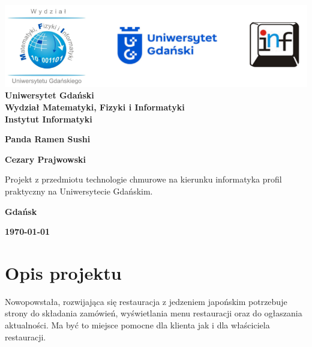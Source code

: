 \documentclass[12pt,a4paper]{article}
\newcommand{\hmwkTitle}{Panda Ramen Sushi} %
\newcommand{\hmwkDueDate}{\today} %
\newcommand{\hmwkAuthorName}{Cezary Prajwowski} %
\begin{document}
\begin{titlepage}
    \vfill
	\begin{center}
	\hspace*{-1cm}
	\vspace*{0.5cm}
    \includegraphics[scale=0.55]{imagens/loga.png}\\
	\textbf{Uniwersytet Gdański \\ [0.05cm]Wydział Matematyki, Fizyki i Informatyki \\ [0.05cm] Instytut Informatyki}

	\vspace{0.6cm}
	\vspace{4cm}
	{\huge \textbf{\hmwkTitle}}\vspace{8mm}
	
	{\large \textbf{\hmwkAuthorName}}\\[3cm]
	
		\hspace{.45\textwidth} %
	   \begin{minipage}{.5\textwidth}
	   Projekt z przedmiotu technologie chmurowe na kierunku informatyka profil praktyczny na Uniwersytecie Gdańskim.\\[0.1cm]
	  \end{minipage}
	  \vfill
	
	\textbf{Gdańsk}
	
	\textbf{\hmwkDueDate}
	\end{center}
	
\end{titlepage}

\newpage
\setcounter{secnumdepth}{5}
\tableofcontents
\newpage

\section{Opis projektu}
\label{sec:Project}

Nowopowstała, rozwijająca się restauracja z jedzeniem japońskim potrzebuje strony do składania zamówień, wyświetlania menu restauracji oraz do ogłaszania aktualności. Ma być to miejsce pomocne dla klienta jak i dla właściciela restauracji.
\end{document}
